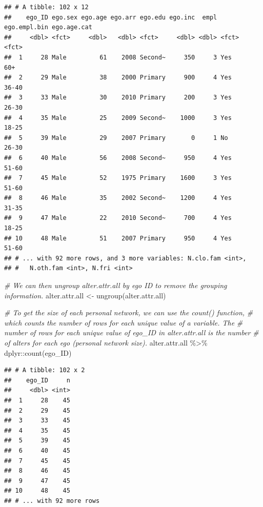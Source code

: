 \documentclass[
]{book}
\newenvironment{Shaded}{\begin{snugshade}}{\end{snugshade}}
\newcommand{\CommentTok}[1]{\textcolor[rgb]{0.56,0.35,0.01}{\textit{#1}}}
\newcommand{\FunctionTok}[1]{\textcolor[rgb]{0.00,0.00,0.00}{#1}}
\newcommand{\NormalTok}[1]{#1}
\newcommand{\OtherTok}[1]{\textcolor[rgb]{0.56,0.35,0.01}{#1}}
\newcommand{\SpecialCharTok}[1]{\textcolor[rgb]{0.00,0.00,0.00}{#1}}
\begin{document}
\begin{verbatim}
## # A tibble: 102 x 12
##    ego_ID ego.sex ego.age ego.arr ego.edu ego.inc  empl ego.empl.bin ego.age.cat
##     <dbl> <fct>     <dbl>   <dbl> <fct>     <dbl> <dbl> <fct>        <fct>      
##  1     28 Male         61    2008 Second~     350     3 Yes          60+        
##  2     29 Male         38    2000 Primary     900     4 Yes          36-40      
##  3     33 Male         30    2010 Primary     200     3 Yes          26-30      
##  4     35 Male         25    2009 Second~    1000     3 Yes          18-25      
##  5     39 Male         29    2007 Primary       0     1 No           26-30      
##  6     40 Male         56    2008 Second~     950     4 Yes          51-60      
##  7     45 Male         52    1975 Primary    1600     3 Yes          51-60      
##  8     46 Male         35    2002 Second~    1200     4 Yes          31-35      
##  9     47 Male         22    2010 Second~     700     4 Yes          18-25      
## 10     48 Male         51    2007 Primary     950     4 Yes          51-60      
## # ... with 92 more rows, and 3 more variables: N.clo.fam <int>,
## #   N.oth.fam <int>, N.fri <int>
\end{verbatim}

\begin{Shaded}
\begin{Highlighting}[]
\CommentTok{\# We can then ungroup alter.attr.all by ego ID to remove the grouping information.}
\NormalTok{alter.attr.all }\OtherTok{\textless{}{-}} \FunctionTok{ungroup}\NormalTok{(alter.attr.all)}

\CommentTok{\# To get the size of each personal network, we can use the count() function,}
\CommentTok{\# which counts the number of rows for each unique value of a variable. The}
\CommentTok{\# number of rows for each unique value of ego\_ID in alter.attr.all is the number}
\CommentTok{\# of alters for each ego (personal network size).}
\NormalTok{alter.attr.all }\SpecialCharTok{\%\textgreater{}\%} 
\NormalTok{  dplyr}\SpecialCharTok{::}\FunctionTok{count}\NormalTok{(ego\_ID)}
\end{Highlighting}
\end{Shaded}

\begin{verbatim}
## # A tibble: 102 x 2
##    ego_ID     n
##     <dbl> <int>
##  1     28    45
##  2     29    45
##  3     33    45
##  4     35    45
##  5     39    45
##  6     40    45
##  7     45    45
##  8     46    45
##  9     47    45
## 10     48    45
## # ... with 92 more rows
\end{verbatim}
\end{document}

